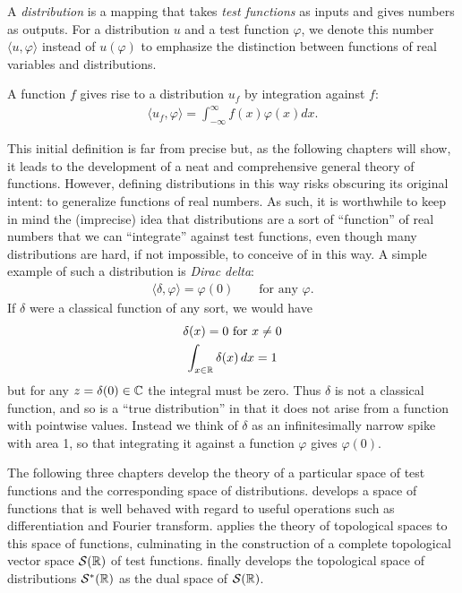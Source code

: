     \begin{defn}
      A \emph{distribution} is a mapping that takes \emph{test functions} as inputs and gives numbers as outputs.
      For a distribution $u$ and a test function $\varphi$, we denote this number $\langle u, \varphi \rangle$ instead of $u(\varphi)$ to emphasize the distinction between functions of real variables and distributions.

      A function $f$ gives rise to a distribution $u_f$ by integration against $f$:
      \begin{align*}
        \langle u_f, \varphi \rangle = \int_{-\infty}^{\infty} f(x)\varphi(x)dx \text{.}
      \end{align*}

    \end{defn}

    This initial definition is far from precise but, as the following chapters will show, it leads to the development of a neat and comprehensive general theory of functions.
    However, defining distributions in this way risks obscuring its original intent: to generalize functions of real numbers.
    As such, it is worthwhile to keep in mind the (imprecise) idea that distributions are a sort of ``function'' of real numbers that we can ``integrate'' against test functions, even though many distributions are hard, if not impossible, to conceive of in this way.
    A simple example of such a distribution is \emph{Dirac delta}:
    \begin{gather*}
      \langle\delta,\varphi\rangle = \varphi(0)
      \qquad\text{for any }\varphi \text{.}
    \end{gather*}
    If $\delta$ were a classical function of any sort, we would have
    \begin{gather*}
      \delta(x)=0\text{ for }x\ne0\\
      \int_{x\in\mathbb{R}} \delta(x)\,dx = 1
    \end{gather*}
    but for any $z=\delta(0)\in\mathbb{C}$ the integral must be zero.
    Thus $\delta$ is not a classical function, and so is a ``true distribution'' in that it does not arise from a function with pointwise values.
    Instead we think of $\delta$ as an infinitesimally narrow spike with area 1, so that integrating it against a function $\varphi$ gives $\varphi(0)$.
  
    The following three chapters develop the theory of a particular space of test functions and the corresponding space of distributions.
     develops a space of functions that is well behaved with regard to useful operations such as differentiation and Fourier transform.
     applies the theory of topological spaces to this space of functions, culminating in the construction of a complete topological vector space $\mathcal{S}(\mathbb{R})$ of test functions.
     finally develops the topological space of distributions $\mathcal{S}^*(\mathbb{R})$ as the dual space of $\mathcal{S}(\mathbb{R})$. 


